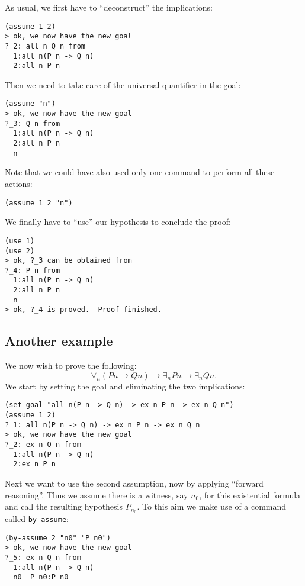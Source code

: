 \documentclass[12pt]{amsart}
\newcommand{\inquotes}[1]{``#1''}
\begin{document}
As usual, we first have to \inquotes{deconstruct} the implications:
\begin{verbatim}
(assume 1 2)
> ok, we now have the new goal
?_2: all n Q n from
  1:all n(P n -> Q n)
  2:all n P n
\end{verbatim}

Then we need to take care of the universal quantifier in the goal:
\begin{verbatim}
(assume "n")
> ok, we now have the new goal
?_3: Q n from
  1:all n(P n -> Q n)
  2:all n P n
  n
\end{verbatim}

Note that we could have also used only one command to perform all
these actions:
\begin{verbatim}
(assume 1 2 "n")
\end{verbatim}

We finally have to \inquotes{use} our hypothesis to conclude the proof:
\begin{verbatim}
(use 1)
(use 2)
> ok, ?_3 can be obtained from
?_4: P n from
  1:all n(P n -> Q n)
  2:all n P n
  n
> ok, ?_4 is proved.  Proof finished.
\end{verbatim}


\subsection{Another example}
We now wish to prove the following:
\begin{equation*}
  \forall_n (P n \to Q n) \to \exists_n P n \to \exists_n Q n.
\end{equation*}
We start by setting the goal and eliminating the two implications:
\begin{verbatim}
(set-goal "all n(P n -> Q n) -> ex n P n -> ex n Q n")
(assume 1 2)
?_1: all n(P n -> Q n) -> ex n P n -> ex n Q n
> ok, we now have the new goal
?_2: ex n Q n from
  1:all n(P n -> Q n)
  2:ex n P n
\end{verbatim}

Next we want to use the second assumption, now by applying
\inquotes{forward reasoning}. Thus we assume there is a witness, say
$n_0$, for this existential formula and call the resulting hypothesis
$P_{n_0}$.  To this aim we make use of a command called
\texttt{by-assume}:
\begin{verbatim}
(by-assume 2 "n0" "P_n0")
> ok, we now have the new goal
?_5: ex n Q n from
  1:all n(P n -> Q n)
  n0  P_n0:P n0
\end{verbatim}
\end{document}
